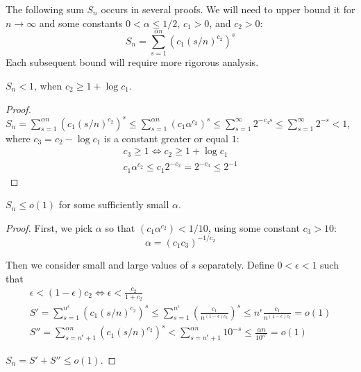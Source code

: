 The following sum $S_n$ occurs in several proofs. We will need to upper bound it
for $n\to\infty$ and some constants $0<\alpha\leq 1/2$, $c_1>0$, and $c_2>0$:
\begin{equation}
    S_n=\sum_{s=1}^{\alpha n}{\left(c_1(s/n)^{c_2}\right)^s}
\end{equation}
Each subsequent bound will require more rigorous analysis.

\begin{proposition}
    $S_n<1$, when $c_2\geq1+\log c_1$.
\end{proposition}

\begin{proof}
    $S_n=\sum_{s=1}^{\alpha n}{\left(c_1(s/n)^{c_2}\right)^s}
    \leq\sum_{s=1}^{\alpha n}{\left(c_1\alpha^{c_2}\right)^s}
    \leq\sum_{s=1}^{\infty}{2^{-c_3s}}
    \leq\sum_{s=1}^{\infty}{2^{-s}}<1$,
    where $c_3=c_2-\log c_1$ is a constant greater or equal $1$:
    \begin{gather}
        c_3\geq 1\iff c_2\geq 1+\log c_1\\
        c_1\alpha^{c_2}\leq c_1 2^{-c_2}=2^{-c_3}\leq 2^{-1}
    \end{gather}
\end{proof}

\begin{proposition}
    \label{pro:bound-prob-small-sets}
    $S_n\leq o(1)$ for some sufficiently small $\alpha$.
\end{proposition}

\begin{proof}
    First, we pick $\alpha$ so that $\left(c_1\alpha^{c_2}\right)<1/10$,
    using some constant $c_3>10$:
    \begin{equation}
        \alpha=(c_1c_3)^{-1/c_2}
    \end{equation}
    
    Then we consider small and large values of $s$ separately.
    Define $0<\epsilon<1$ such that
    \begin{gather}
        \epsilon<(1-\epsilon)c_2\iff\epsilon<\frac{c_2}{1+c_2}\\
        S'=\sum_{s=1}^{n^\epsilon}{\left(c_1(s/n)^{c_2}\right)^s}
        \leq\sum_{s=1}^{n^\epsilon}{\left(\frac{c_1}{n^{(1-\epsilon)c_2}}\right)^s}
        \leq n^\epsilon\frac{c_1}{n^{(1-\epsilon)c_2}}=o(1)\\
        S''=\sum_{s=n^\epsilon+1}^{\alpha n}{(c_1(s/n)^{c_2})^s}
        <\sum_{s=n^\epsilon+1}^{\alpha n}{10^{-s}}
        \leq\frac{\alpha n}{10^{n^\epsilon}}=o(1)
    \end{gather}
    
    $S_n=S'+S''\leq o(1)$.
\end{proof}

